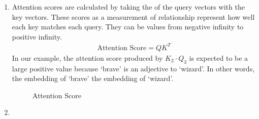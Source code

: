 \documentclass[letterpaper,11pt,english]{sphinxmanual}
\begin{document}
\begin{enumerate}
\begin{figure}[htbp]
\centering
\capstart

\noindent{}
\caption{Key Projection}\label{\detokenize{pretraining:id16}}\end{figure}

\item {} 
\sphinxAtStartPar
{}

\sphinxAtStartPar
Attention scores are calculated by taking the  of the
query vectors with the key vectors. These scores as a measurement of
relationship represent how well each key matches each query. They can
be values from negative infinity to positive infinity.
\begin{equation*}
\begin{split}\text{Attention Score} = QK^T\end{split}
\end{equation*}
\sphinxAtStartPar
In our example, the attention score produced by \(K_2 \cdot Q_3\)
is expected to be a large positive value because ‘brave’ is an
adjective to ‘wizard’. In other words, the embedding of ‘brave’
 the embedding of ‘wizard’.

\begin{figure}[htbp]
\centering
\capstart

\noindent{}
\caption{Attention Score}\label{\detokenize{pretraining:id17}}\end{figure}

\item {} 
\sphinxAtStartPar
{}


\end{enumerate}
\end{document}
